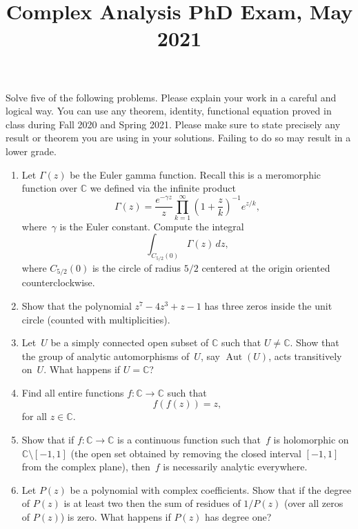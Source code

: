 \documentclass[11pt,letterpaper]{article}
\title{Complex Analysis PhD Exam, May 2021}
\author{}
\date{}
\newenvironment{examproblems}[2]{%
  \def\ProblemHeadingTag{#2}%
  \AssignTaggingSocketPlug{block/list/label}{examproblem}%
  \begin{enumerate}%
  \setcounter{enumi}{#1}%
  \renewcommand{\labelenumi}{\textbf{\theenumi.}}%
  \setlength{\topsep}{0.35em}%
  \setlength{\partopsep}{0pt}%
  \setlength{\itemsep}{0.48em}%
  \setlength{\parsep}{0.18em}%
}{\end{enumerate}}
\newenvironment{examinstructions}{%
  \par\begingroup\itshape
}{%
  \par\endgroup\vspace{0.18em}
}
\begin{document}
\maketitle
\thispagestyle{empty}
\begin{examinstructions}
Solve five of the following problems. Please explain your work in a careful and logical way. You can use any theorem, identity, functional equation proved in class during Fall 2020 and Spring 2021. Please make sure to state precisely any result or theorem you are using in your solutions. Failing to do so may result in a lower grade.
\end{examinstructions}
\begin{examproblems}{0}{H2}
\def\ProblemHeadingText{Problem 1.}
\item
Let \(\Gamma(z)\) be the Euler gamma function. Recall this is a meromorphic function over \(\mathbb C\) we defined via the infinite product
\[
\Gamma(z)=\frac{e^{-\gamma z}}{z}\prod_{k=1}^{\infty}\left(1+\frac{z}{k}\right)^{-1}e^{z/k},
\]
 where~\(\gamma\) is the Euler constant. Compute the integral
\[
\int_{C_{5/2}(0)}\Gamma(z)\,dz,
\]
 where \(C_{5/2}(0)\) is the circle of radius \(5/2\) centered at the origin oriented counterclockwise.
\def\ProblemHeadingText{Problem 2.}
\item
Show that the polynomial \(z^7-4z^3+z-1\) has three zeros inside the unit circle (counted with multiplicities).
\def\ProblemHeadingText{Problem 3.}
\item
Let~\(U\) be a simply connected open subset of \(\mathbb C\) such that \(U\ne\mathbb C\). Show that the group of analytic automorphisms of~\(U\), say \(\operatorname{Aut}(U)\), acts transitively on~\(U\). What happens if \(U=\mathbb C\)?
\def\ProblemHeadingText{Problem 4.}
\item
Find all entire functions \(f:\mathbb C\to\mathbb C\) such that
\[
f(f(z))=z,
\]
 for all \(z\in\mathbb C\).
\def\ProblemHeadingText{Problem 5.}
\item
Show that if \(f:\mathbb C\to\mathbb C\) is a continuous function such that~\(f\) is holomorphic on \(\mathbb C\setminus[-1,1]\) (the open set obtained by removing the closed interval \([-1,1]\) from the complex plane), then~\(f\) is necessarily analytic everywhere.
\def\ProblemHeadingText{Problem 6.}
\item
Let \(P(z)\) be a polynomial with complex coefficients. Show that if the degree of \(P(z)\) is at least two then the sum of residues of \(1/P(z)\) (over all zeros of \(P(z)\)) is zero. What happens if \(P(z)\) has degree one?

\end{examproblems}
\end{document}
